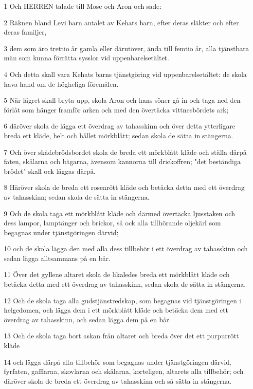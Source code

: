 \par 1 Och HERREN talade till Mose och Aron och sade:
\par 2 Räknen bland Levi barn antalet av Kehats barn, efter deras släkter och efter deras familjer,
\par 3 dem som äro trettio år gamla eller därutöver, ända till femtio år, alla tjänstbara män som kunna förrätta sysslor vid uppenbarelsetältet.
\par 4 Och detta skall vara Kehats barns tjänstgöring vid uppenbarelsetältet: de skola hava hand om de högheliga föremålen.
\par 5 När lägret skall bryta upp, skola Aron och hans söner gå in och taga ned den förlåt som hänger framför arken och med den övertäcka vittnesbördets ark;
\par 6 däröver skola de lägga ett överdrag av tahasskinn och över detta ytterligare breda ett kläde, helt och hållet mörkblått; sedan skola de sätta in stängerna.
\par 7 Och över skådebrödsbordet skola de breda ett mörkblått kläde och ställa därpå faten, skålarna och bägarna, ävensom kannorna till drickoffren; "det beständiga brödet" skall ock läggas därpå.
\par 8 Häröver skola de breda ett rosenrött kläde och betäcka detta med ett överdrag av tahasskinn; sedan skola de sätta in stängerna.
\par 9 Och de skola taga ett mörkblått kläde och därmed övertäcka ljusstaken och dess lampor, lamptänger och brickor, så ock alla tillhörande oljekärl som begagnas under tjänstgöringen därvid;
\par 10 och de skola lägga den med alla dess tillbehör i ett överdrag av tahasskinn och sedan lägga alltsammans på en bår.
\par 11 Över det gyllene altaret skola de likaledes breda ett mörkblått kläde och betäcka detta med ett överdrag av tahasskinn, sedan skola de sätta in stängerna.
\par 12 Och de skola taga alla gudstjänstredskap, som begagnas vid tjänstgöringen i helgedomen, och lägga dem i ett mörkblått kläde och betäcka dem med ett överdrag av tahasskinn, och sedan lägga dem på en bår.
\par 13 Och de skola taga bort askan från altaret och breda över det ett purpurrött kläde
\par 14 och lägga därpå alla tillbehör som begagnas under tjänstgöringen därvid, fyrfaten, gafflarna, skovlarna och skålarna, korteligen, altarets alla tillbehör; och däröver skola de breda ett överdrag av tahasskinn och så sätta in stängerna.
